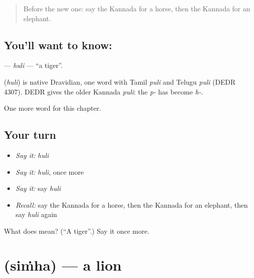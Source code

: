 \label{lesson:KA-C129-huli}



\begin{quote}
Before the new one: say the Kannada for a horse, then the Kannada for an elephant.
\end{quote}

\subsection*{You'll want to know: }
\textbf{} — \emph{huli} — \textquotedblleft{}a tiger\textquotedblright{}.

\begin{cousinweb}
\textbf{} (\emph{huli}) is native Dravidian, one word with Tamil \emph{puli} and Telugu \emph{puli} (DEDR 4307). DEDR gives the older Kannada \emph{puli}: the \emph{p-} has become \emph{h-}.
\end{cousinweb}

\begin{grammarlens}[title={What you've built}]
One more word for this chapter.
\end{grammarlens}

\subsection*{Your turn}
\begin{itemize}
\raggedright
  \item \emph{Say it:} \emph{huli}
  \item \emph{Say it:} \emph{huli}, once more
  \item \emph{Say it:} say \emph{huli}
  \item \emph{Recall:} say the Kannada for a horse, then the Kannada for an elephant, then say \emph{huli} again
\end{itemize}

\begin{tcolorbox}[breakable,colback=teal!4,colframe=teal!35!black,title={Before you move on}]
What does  mean? (\textquotedblleft{}A tiger\textquotedblright{}.) Say it once more.
\end{tcolorbox}
\section[\texorpdfstring{\kn{ಸಿಂಹ} (siṁha)}{ಸಿಂಹ (siṁha)}]{ (siṁha) — a lion}

\label{lesson:KA-C129-simha}



